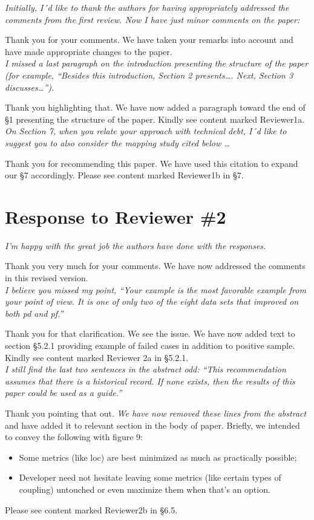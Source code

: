 \documentclass[twocolumn,5p]{elsarticle}
\newcommand{\bi}{\begin{itemize}[leftmargin=0.4cm]}
\newcommand{\ei}{\end{itemize}}
\newcommand{\review}[1]{\noindent\textit{#1\\}}
\theoremstyle{break}
\begin{document}
	\review{Initially, I´d like to thank the authors for having appropriately 
	addressed the comments from the first review. Now I have just minor 
	comments on the paper:}
	
	Thank you for your comments. We have taken your remarks into account and 
	have made appropriate changes to the paper.\\
	
	\review{I missed a last paragraph on the introduction presenting the 
	structure of the paper (for example, ``Besides this introduction, Section 2 
	presents\ldots. Next, Section 3 discusses…'').}
	
	Thank you highlighting that. We have now added a paragraph toward the end 
	of \S1
	presenting the structure of the paper. Kindly see content marked 
	{\color{steel2} Reviewer1a}.\\
	
	\review{On Section 7, when you relate your approach with technical debt, 
	I´d like to suggest you to also consider the mapping study cited below 
	\ldots}	

	Thank you for recommending this paper. We have used this citation to expand 
	our \S7 accordingly. Please see content marked 
	{\color{steel2} Reviewer1b} in \S7.
	\newpage
	\section*{Response to Reviewer \#2}
	
	\review{I’m happy with the great job the authors have done with the 
	responses.} 
	
	Thank you very much for your comments. We have now addressed the comments 
	in this 
	revised version.\\
	
	\review{I believe you missed my point, ``Your example is the most favorable 
	example from your point of view. It is one of only two of the eight data 
	sets that improved on both pd and pf.'' }

	Thank you for that clarification. We see the issue. We have now added text 
	to section \S5.2.1 providing example of failed cases in addition to 
	positive sample. Kindly see content marked {\color{steel2}Reviewer 2a} in 
	\S5.2.1.\\
	
	\review{I still find the last two sentences in the abstract odd: ``This 
	recommendation assumes that there is a historical record. If none exists, 
	then the results of this paper could be used as a guide.''}
	
	Thank you pointing that out. \textit{We have now removed these lines from 
	the abstract} 
	and have added it to relevant section in the body of paper. Briefly, we 
	intended to 
	convey the following with figure 9:
	\bi
	\item Some metrics (like loc) are best minimized as much as practically 
	possible;
	\item Developer need not hesitate leaving some metrics (like certain types 
	of coupling) 
	untouched or even maximize them when that's an option.
	\ei
	
	
	Please see content marked {\color{steel2} Reviewer2b} in \S6.5.
\end{document}
